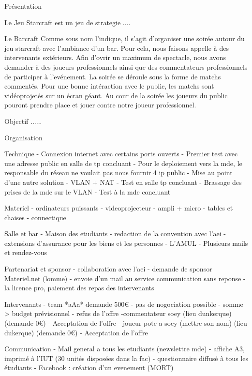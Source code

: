 Présentation

	Le Jeu
	   Starcraft est un jeu de strategie ....

	Le Barcraft
	   Comme sous nom l'indique, il s'agit d'organiser une soirée autour du jeu starcraft avec l'ambiance d'un bar.	Pour cela, nous faisons appelle à des intervenants extérieurs. Afin d'ovrir un maximum de spectacle, nous avons demander à des joueurs professionnels ainsi que des commentateurs professionnels de participer à l'evénement. La soirée se déroule sous la forme de matchs commentés. Pour une bonne intéraction avec le public, les matchs sont vidéoprojetés sur un écran géant. Au cour de la soirée les joueurs du public pouront prendre place et jouer contre notre joueur professionnel.


Objectif
	......

Organisation
	
	Technique
		- Connexion internet avec certains ports ouverts
		- Premier test avec une adresse public en salle de tp concluant
		- Pour le deploiement vers la mde, le responsable du réseau ne voulait pas nous fournir 4 ip public
		- Mise au point d'une autre solution 
		       - VLAN + NAT
		- Test en salle tp concluant
 		- Brassage des prises de la mde sur le VLAN
		- Test à la mde concluant 
		
	Materiel
		- ordinateurs puissants
		- videoprojecteur
		- ampli + micro
		- tables et chaises
		- connectique

	Salle et bar 
	      - Maison des etudiants
	      	       - redaction de la convention avec l'aei
		       - extensions d'assurance pour les biens et les personnes
	      - L'AMUL
			- Plusieurs mails et rendez-vous

	Partenariat et sponsor
		    - collaboration avec l'aei
		    - demande de sponsor Materiel.net (lomme)
		    - envoie d'un mail au service communication sans reponse
		    - la licence pro, paiement des repas des intervenants
		    
	Intervenants
		- team *aAa* demande 500€ 
                    - pas de nogociation possible
                    - somme > budget prévisionnel
                    - refus de l'offre
                -commentateur soey (lieu dunkerque) (demande 0€)
                    - Acceptation de l'offre
                - joueur pote a soey (mettre son nom) (lieu dukerque) (demande 0€)
                    - Acceptation de l'offre

        Communication
                - Mail general a tous les etudiants (newslettre mde)
                - affiche A3, imprimé à l'IUT (30 unités disposées dans la fac)
                - questionnaire diffusé à tous les étudiants
                - Facebook : création d'un evenement (MORT)

